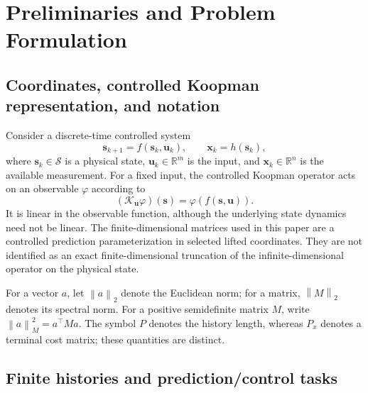 \documentclass[journal]{IEEEtran}
\newcommand{\vx}{\mathbf{x}}
\newcommand{\vu}{\mathbf{u}}
\newcommand{\vs}{\mathbf{s}}
\newcommand{\R}{\mathbb{R}}
\newcommand{\norm}[1]{\left\lVert #1\right\rVert}
\begin{document}
\section{Preliminaries and Problem Formulation}
\label{sec:prelim}

\subsection{Coordinates, controlled Koopman representation, and notation}

Consider a discrete-time controlled system
\begin{equation}
    \vs_{k+1}=f(\vs_k,\vu_k),\qquad \vx_k=h(\vs_k),
    \label{eq:physical_system}
\end{equation}
where $\vs_k\in\mathcal S$ is a physical state, $\vu_k\in\R^m$ is the input, and $\vx_k\in\R^n$ is the available measurement. For a fixed input, the controlled Koopman operator acts on an observable $\varphi$ according to
\begin{equation}
    (\mathcal K_{\vu}\varphi)(\vs)=\varphi(f(\vs,\vu)).
    \label{eq:koopman_operator}
\end{equation}
It is linear in the observable function, although the underlying state dynamics need not be linear. The finite-dimensional matrices used in this paper are a controlled prediction parameterization in selected lifted coordinates. They are not identified as an exact finite-dimensional truncation of the infinite-dimensional operator on the physical state.

For a vector $a$, let $\norm{a}_2$ denote the Euclidean norm; for a matrix, $\norm{M}_2$ denotes its spectral norm. For a positive semidefinite matrix $M$, write $\norm{a}_M^2=a^\top M a$. The symbol $P$ denotes the history length, whereas $P_x$ denotes a terminal cost matrix; these quantities are distinct.

\subsection{Finite histories and prediction/control tasks}
\end{document}
